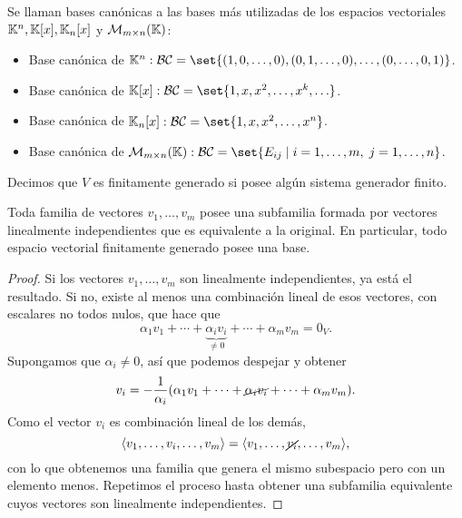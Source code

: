 \begin{example}
	Se llaman bases canónicas a las bases más utilizadas de los espacios vectoriales \(\mathbb{K}^{n }, \mathbb{K}[x], \mathbb{K}_n[x]\) y \(\mathcal{\MakeUppercase{m}}_{m \times n}(\K )\):
	\begin{itemize}
		\item Base canónica de \(\K^{n}: \mathcal{\MakeUppercase{bc}} = \set{(1,0,\ldots,0), (0,1,\ldots,0), \ldots, (0,\ldots,0,1)}  \).
		\item Base canónica de \(\K[x]: \mathcal{\MakeUppercase{bc}} = \set{1,x,x^{2},\ldots,x^{k},\ldots  }  \).
		\item Base canónica de \(\K_n[x]: \mathcal{\MakeUppercase{bc}} = \set{1,x,x^{2},\ldots,x^{n}   }  \).
		\item Base canónica de \(\mathcal{\MakeUppercase{m}}_{m \times n}(\K): \mathcal{\MakeUppercase{bc}} = \set{E_{ij} \mid i = 1, \ldots, m, \; j = 1, \ldots, n}  \).
	\end{itemize}
\end{example}
\begin{definition}
	Decimos que \(V \) es finitamente generado si posee algún sistema generador finito.
\end{definition}
\begin{lemma}
	\label{bases}
	Toda familia de vectores \(v_1, \ldots, v_m \) posee una subfamilia formada por vectores linealmente independientes que es equivalente a la original. En particular, todo espacio vectorial finitamente generado posee una base.
\end{lemma}
\begin{proof}
	Si los vectores \(v_1, \ldots, v_m \) son linealmente independientes, ya está el resultado. Si no, existe al menos una combinación lineal de esos vectores, con escalares no todos nulos, que hace que
	\[
		\alpha_1 v_1 + \cdots + \underbrace{\alpha_i v_i}_{\neq 0} + \cdots + \alpha_m v_m = 0_V.
	\]
	Supongamos que \(\alpha_i \neq 0 \), así que podemos despejar y obtener
	\[
		v_i = -\frac{1 }{\alpha_i }(\alpha_1 v_1 + \cdots + \cancel {\alpha_i v_i} + \cdots + \alpha_m v_m).
	\]
	Como el vector \(v_i \) es combinación lineal de los demás,
	\[
		\langle v_1, \ldots, v_{i}, \ldots, v_m \rangle = \langle v_1, \ldots, \cancel {v_i}, \ldots, v_m \rangle,
	\]
	con lo que obtenemos una familia que genera el mismo subespacio pero con un elemento menos. Repetimos el proceso hasta obtener una subfamilia equivalente cuyos vectores son linealmente independientes.
\end{proof}

